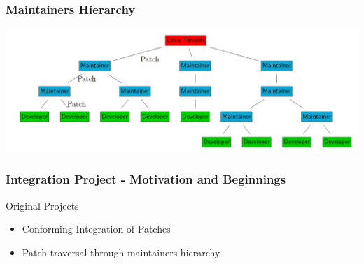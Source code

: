 \documentclass[12pt]{beamer}
\begin{document}
	

	\begin{frame}
	\frametitle{Maintainers Hierarchy}
     		\includegraphics[width=1.0\textwidth]{pics/maintainers_hierarchy.png}
	\end{frame}



	\begin{frame}
	\frametitle{Integration Project - Motivation and Beginnings}
		\begin{block}{Original Projects}
			\begin{itemize}
				\item Conforming Integration of Patches
				\item Patch traversal through maintainers hierarchy
			\end{itemize}
		\end{block}
	\end{frame}


\end{document}
